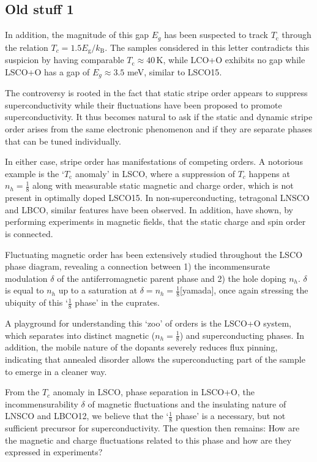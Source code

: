 \subsection{Old stuff 1}
In addition, the magnitude of this gap $E_g$ has been suspected to track $T_\text{c}$ through the relation $T_c = 1.5 E_\text{g}/k_\text{B}$\cite{Kofu2009}. The samples considered in this letter contradicts this suspicion by having comparable $T_\text{c} \approx 40\,\text{K}$, while LCO+O exhibits no gap\cite{Jacobsen2018,Wells1997} while LSCO+O has a gap of $E_g \approx 3.5$ meV, similar to LSCO15\cite{Lee2000}.


The controversy is rooted in the fact that static stripe order appears to suppress superconductivity while their fluctuations have been proposed to promote superconductivity. It thus becomes natural to ask if the static and dynamic stripe order arises from the same electronic phenomenon and if they are separate phases that can be tuned individually. 

In either case, stripe order has manifestations of competing orders. A notorious example is the `$T_\text{c}$ anomaly' in LSCO, where a suppression of $T_c$ happens at $n_h=\frac{1}{8}$ along with measurable static magnetic and charge order\cite{Christensen2014,Croft2014,Thampy2014}, which is not present in optimally doped LSCO15. In non-superconducting, tetragonal LNSCO and LBCO, similar features have been observed\cite{Wilkins2011}. In addition, \citeauthor{Christensen2014} have shown, by performing experiments in magnetic fields, that the static charge and spin order is connected\cite{Christensen2014}.

Fluctuating magnetic order has been extensively studied throughout the LSCO phase diagram, revealing a connection between 1) the incommensurate modulation $\delta$ of the antiferromagnetic parent phase and 2) the hole doping $n_h$. $\delta$ is equal to $n_h$ up to a saturation at $\delta = n_h = \frac{1}{8}$[yamada], once again stressing the ubiquity of this `$\frac{1}{8}$ phase' in the cuprates.

A playground for understanding this `zoo' of orders is the LSCO+O system, which separates\cite{Mohottala2006} into distinct magnetic ($n_h=\frac{1}{8}$) and superconducting phases\cite{Udby2013}. In addition, the mobile nature of the dopants severely reduces flux pinning\cite{Mohottala2008}, indicating that annealed disorder allows the superconducting part of the sample to emerge in a cleaner way.

From the $T_c$ anomaly in LSCO, phase separation in LSCO+O, the incommensurability $\delta$ of magnetic fluctuations and the insulating nature of LNSCO and LBCO12, we believe that the `$\frac{1}{8}$ phase' is a necessary, but not sufficient precursor for superconductivity. The question then remains: How are the magnetic and charge fluctuations related to this phase and how are they expressed in experiments?

